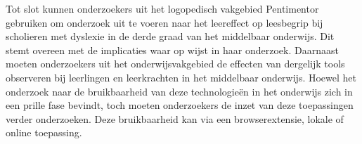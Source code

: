 \medspace

Tot slot kunnen onderzoekers uit het logopedisch vakgebied Pentimentor gebruiken om onderzoek uit te voeren naar het leereffect op leesbegrip bij scholieren met dyslexie in de derde graad van het middelbaar onderwijs. Dit stemt overeen met de implicaties waar \textcite{Gooding2022} op wijst in haar onderzoek. Daarnaast moeten onderzoekers uit het onderwijsvakgebied de effecten van dergelijk tools observeren bij leerlingen en leerkrachten in het middelbaar onderwijs. Hoewel het onderzoek naar de bruikbaarheid van deze technologieën in het onderwijs zich in een prille fase bevindt, toch moeten onderzoekers de inzet van deze toepassingen verder onderzoeken. Deze bruikbaarheid kan via een browserextensie, lokale of online toepassing.